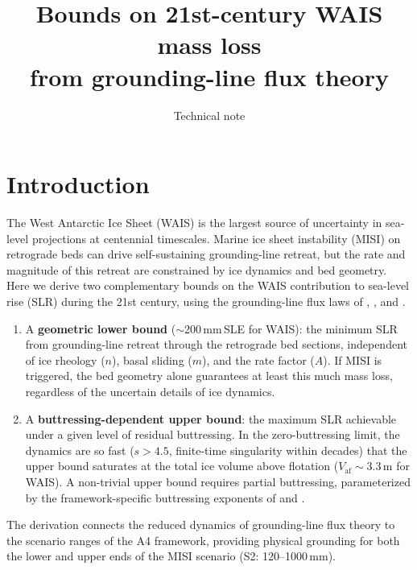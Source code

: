 \documentclass[11pt]{article}
\title{Bounds on 21st-century WAIS mass loss\\from grounding-line flux theory}
\author{Technical note}
\date{}
\newcommand{\Vaf}{V_{\mathrm{af}}}
\begin{document}
\maketitle

\section{Introduction}

The West Antarctic Ice Sheet (WAIS) is the largest source of uncertainty in sea-level projections at centennial timescales. Marine ice sheet instability (MISI) on retrograde beds can drive self-sustaining grounding-line retreat, but the rate and magnitude of this retreat are constrained by ice dynamics and bed geometry. Here we derive two complementary bounds on the WAIS contribution to sea-level rise (SLR) during the 21st century, using the grounding-line flux laws of \citet{Schoof2007}, \citet{Pegler2018}, and \citet{HaseloffSergienko2018}.

\begin{enumerate}
	\item A \textbf{geometric lower bound} ($\sim$200\,mm\,SLE for WAIS): the minimum SLR from grounding-line retreat through the retrograde bed sections, independent of ice rheology ($n$), basal sliding ($m$), and the rate factor ($A$). If MISI is triggered, the bed geometry alone guarantees at least this much mass loss, regardless of the uncertain details of ice dynamics.

	\item A \textbf{buttressing-dependent upper bound}: the maximum SLR achievable under a given level of residual buttressing. In the zero-buttressing limit, the dynamics are so fast ($s > 4.5$, finite-time singularity within decades) that the upper bound saturates at the total ice volume above flotation ($\Vaf \sim 3.3$\,m for WAIS). A non-trivial upper bound requires partial buttressing, parameterized by the framework-specific buttressing exponents of \citet{Pegler2018} and \citet{HaseloffSergienko2018}.
\end{enumerate}

The derivation connects the reduced dynamics of grounding-line flux theory to the scenario ranges of the A4 framework, providing physical grounding for both the lower and upper ends of the MISI scenario (S2: 120--1000\,mm).


\end{document}
